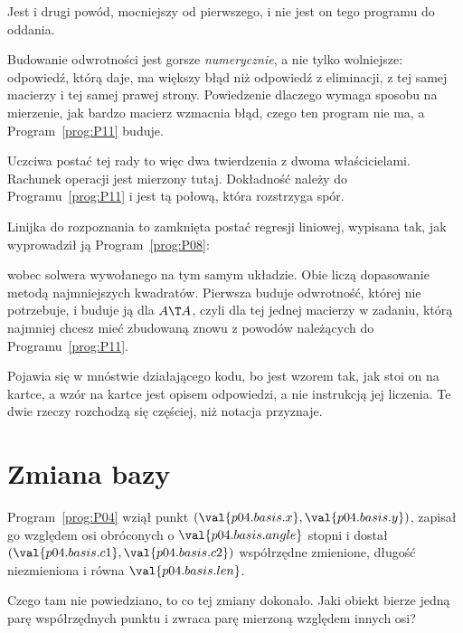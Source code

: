 \begin{fr}
Jest i drugi powód, mocniejszy od pierwszego, i nie jest on tego programu do
oddania.

Budowanie odwrotności jest gorsze \emph{numerycznie}, a nie tylko wolniejsze:
odpowiedź, którą daje, ma większy błąd niż odpowiedź z eliminacji, z tej samej
macierzy i tej samej prawej strony. Powiedzenie dlaczego wymaga sposobu na
mierzenie, jak bardzo macierz wzmacnia błąd, czego ten program nie ma, a
Program~\ref{prog:P11} buduje.

Uczciwa postać tej rady to więc dwa twierdzenia z dwoma właścicielami. Rachunek
operacji jest mierzony tutaj. Dokładność należy do Programu~\ref{prog:P11} i
jest tą połową, która rozstrzyga spór.
\end{fr}

\begin{aibox}
Linijka do rozpoznania to zamknięta postać regresji liniowej, wypisana tak, jak
wyprowadził ją Program~\ref{prog:P08}:
\begin{center}
\end{center}
wobec solwera wywołanego na tym samym układzie. Obie liczą dopasowanie metodą
najmniejszych kwadratów. Pierwsza buduje odwrotność, której nie potrzebuje, i
buduje ją dla $A\T A$, czyli dla tej jednej macierzy w zadaniu, którą najmniej
chcesz mieć zbudowaną \dash{} znowu z powodów należących do
Programu~\ref{prog:P11}.

Pojawia się w mnóstwie działającego kodu, bo jest wzorem tak, jak stoi on na
kartce, a wzór na kartce jest opisem odpowiedzi, a nie instrukcją jej liczenia.
Te dwie rzeczy rozchodzą się częściej, niż notacja przyznaje.
\end{aibox}

\section{Zmiana bazy}
\label{sec:P09-basis}

\begin{fr}
Program~\ref{prog:P04} wziął punkt
$(\val{p04.basis.x}, \val{p04.basis.y})$, zapisał go względem osi obróconych o
$\val{p04.basis.angle}$ stopni i dostał
$(\val{p04.basis.c1}, \val{p04.basis.c2})$ \dash{} współrzędne zmienione,
długość niezmieniona i równa $\val{p04.basis.len}$.

Czego tam nie powiedziano, to co tej zmiany dokonało. Jaki obiekt bierze jedną
parę współrzędnych punktu i zwraca parę mierzoną względem innych osi?
\dotline
\nextframe
\end{fr}

